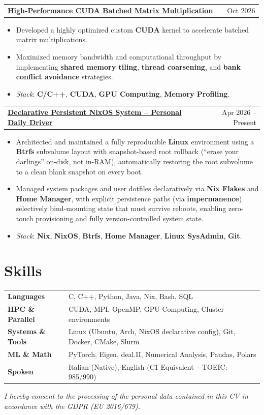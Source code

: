 \documentclass[a4paper,12pt]{article}
\makeatletter
\newenvironment{joblong}[2]
{
\begin{tabularx}{\linewidth}{@{}l X r@{}}
\textbf{#1} & \hfill & #2 \\[1pt]
\end{tabularx}
\begin{minipage}[t]{\linewidth}
\begin{itemize}[nosep,after=\strut, leftmargin=1em, itemsep=2pt,label=--]
}
{
\end{itemize}
\end{minipage}
\vspace{3pt}
}
\makeatother
\begin{document}
\begin{joblong}{\href{https://github.com/DomDegi/ParallelComputingChallenge1}{High-Performance CUDA Batched Matrix Multiplication}}{Oct 2026}
  \item Developed a highly optimized custom \textbf{CUDA} kernel to accelerate batched matrix multiplications.
  \item Maximized memory bandwidth and computational throughput by implementing \textbf{shared memory tiling}, \textbf{thread coarsening}, and \textbf{bank conflict avoidance} strategies.
  \item \textit{Stack}: \textbf{C/C++}, \textbf{CUDA}, \textbf{GPU Computing}, \textbf{Memory Profiling}.
\end{joblong}

\begin{joblong}{\href{https://github.com/DomDegi/nixos-configs}{Declarative Persistent NixOS System -- Personal Daily Driver}}{Apr 2026 -- Present}
  \item Architected and maintained a fully reproducible \textbf{Linux} environment using a \textbf{Btrfs} subvolume layout with snapshot-based root rollback (``erase your darlings'' on-disk, not in-RAM), automatically restoring the root subvolume to a clean blank snapshot on every boot.
  \item Managed system packages and user dotfiles declaratively via \textbf{Nix Flakes} and \textbf{Home Manager}, with explicit persistence paths (via \textbf{impermanence}) selectively bind-mounting state that must survive reboots, enabling zero-touch provisioning and fully version-controlled system state.
  \item \textit{Stack}: \textbf{Nix}, \textbf{NixOS}, \textbf{Btrfs}, \textbf{Home Manager}, \textbf{Linux SysAdmin}, \textbf{Git}.
\end{joblong}
\section{Skills}
\begin{tabularx}{\linewidth}{@{} l X @{}}
\textbf{Languages}       & C, C++, Python, Java, Nix, Bash, SQL \\
\textbf{HPC \& Parallel} & CUDA, MPI, OpenMP, GPU Computing, Cluster environments \\
\textbf{Systems \& Tools}& Linux (Ubuntu, Arch, NixOS declarative config), Git, Docker, CMake, Slurm \\
\textbf{ML \& Math}      & PyTorch, Eigen, deal.II, Numerical Analysis, Pandas, Polars \\
\textbf{Spoken}          & Italian (Native), English (C1 Equivalent -- TOEIC: 985/990) \\
\end{tabularx}

\vfill
\begin{center}
  \footnotesize
  \color{gray}
  \textit{I hereby consent to the processing of the personal data contained in this CV in accordance with the GDPR (EU 2016/679).}
\end{center}
\end{document}
